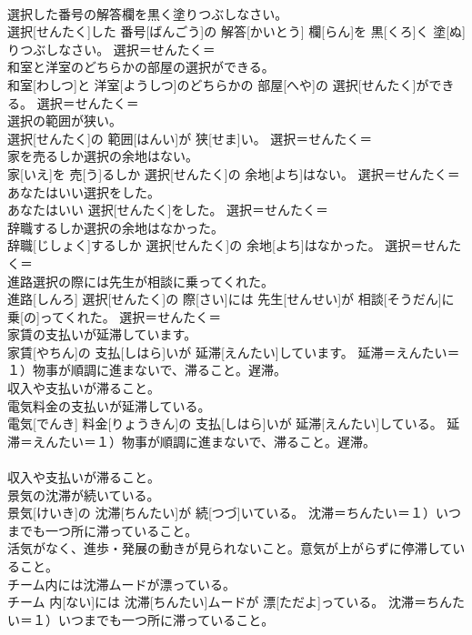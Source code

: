 \documentclass[8pt]{extreport}
\begin{document}
\begin{CJK}{UTF8}{min}
{\\	選択した番号の解答欄を黒く塗りつぶしなさい。	
\\	選択[せんたく]した 番号[ばんごう]の 解答[かいとう] 欄[らん]を 黒[くろ]く 塗[ぬ]りつぶしなさい。	選択＝せんたく＝ 
\\	和室と洋室のどちらかの部屋の選択ができる。	
\\	和室[わしつ]と 洋室[ようしつ]のどちらかの 部屋[へや]の 選択[せんたく]ができる。	選択＝せんたく＝ 
\\	選択の範囲が狭い。	
\\	選択[せんたく]の 範囲[はんい]が 狭[せま]い。	選択＝せんたく＝ 
\\	家を売るしか選択の余地はない。	
\\	家[いえ]を 売[う]るしか 選択[せんたく]の 余地[よち]はない。	選択＝せんたく＝ 
\\	あなたはいい選択をした。	
\\	あなたはいい 選択[せんたく]をした。	選択＝せんたく＝ 
\\	辞職するしか選択の余地はなかった。	
\\	辞職[じしょく]するしか 選択[せんたく]の 余地[よち]はなかった。	選択＝せんたく＝ 
\\	進路選択の際には先生が相談に乗ってくれた。	
\\	進路[しんろ] 選択[せんたく]の 際[さい]には 先生[せんせい]が 相談[そうだん]に 乗[の]ってくれた。	選択＝せんたく＝ 
\\	家賃の支払いが延滞しています。	
\\	家賃[やちん]の 支払[しはら]いが 延滞[えんたい]しています。	延滞＝えんたい＝１）物事が順調に進まないで、滞ること。遅滞。 　　　　　　　　
\\	収入や支払いが滞ること。
\\	電気料金の支払いが延滞している。	
\\	電気[でんき] 料金[りょうきん]の 支払[しはら]いが 延滞[えんたい]している。	延滞＝えんたい＝１）物事が順調に進まないで、滞ること。遅滞。 　　　　　　　　
\\	収入や支払いが滞ること。
\\	景気の沈滞が続いている。	
\\	景気[けいき]の 沈滞[ちんたい]が 続[つづ]いている。	沈滞＝ちんたい＝１）いつまでも一つ所に滞っていること。 　　　　　　　　
\\	活気がなく、進歩・発展の動きが見られないこと。意気が上がらずに停滞していること。
\\	チーム内には沈滞ムードが漂っている。	
\\	チーム 内[ない]には 沈滞[ちんたい]ムードが 漂[ただよ]っている。	沈滞＝ちんたい＝１）いつまでも一つ所に滞っていること。 　　　　　　　　
}
\end{CJK}
\end{document}
